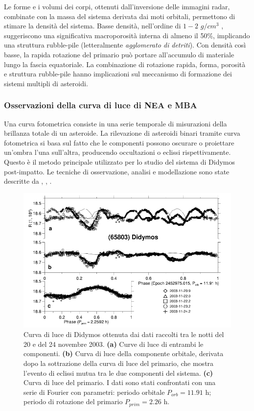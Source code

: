 \documentclass[a4paper,11pt,openright]{book}
\begin{document}
Le forme e i volumi dei corpi, ottenuti dall'inversione delle immagini radar, combinate con la massa del sistema derivata dai moti orbitali, permettono di stimare la densità del sistema. Basse densità, nell'ordine di $1-2\,\,g/cm^3$ \citep{becker_physical_2015, brozovic_radar_2011}, suggeriscono una significativa macroporosità interna di almeno il 50\%, implicando una struttura rubble-pile (letteralmente \textit{agglomerato di detriti}). Con densità così basse, la rapida rotazione del primario può portare all'accumulo di materiale lungo la fascia equatoriale. La combinazione di rotazione rapida, forma, porosità e struttura rubble-pile hanno implicazioni sul meccanismo di formazione dei sistemi multipli di asteroidi.

\subsubsection{Osservazioni della curva di luce di NEA e MBA}
Una curva fotometrica consiste in una serie temporale di misurazioni della brillanza totale di un asteroide. La rilevazione di asteroidi binari tramite curva fotometrica si basa sul fatto che le componenti possono oscurare o proiettare un'ombra l'una sull'altra, producendo occultazioni o eclissi rispettivamente. Questo è il metodo principale utilizzato per lo studio del sistema di Didymos post-impatto. Le tecniche di osservazione, analisi e modellazione sono state descritte da \citet{pravec_photometric_2006}, \citet{scheirich_modeling_2009}, \citet{scheirich_binary_2015}.

\begin{figure}[!h]
    \centering
    \includegraphics[scale=0.55]{figure/didymos_lightcurve.png}
    \caption[Curva di luce di (65803) Didymos.]{Curva di luce di Didymos ottenuta dai dati raccolti tra le notti del 20 e del 24 novembre 2003. \textbf{(a)} Curve di luce di entrambi le componenti. \textbf{(b)} Curva di luce della componente orbitale, derivata dopo la sottrazione della curva di luce del primario, che mostra l'evento di eclissi mutua tra le due componenti del sistema. \textbf{(c)} Curva di luce del primario. I dati sono stati confrontati con una serie di Fourier con parametri: periodo orbitale $P_{orb}=11.91$ h; periodo di rotazione del primario $P_{prim}=2.26$ h. \citep{pravec_photometric_2006}}
    \label{fig:didymos_lightcurve}
\end{figure}
\end{document}
